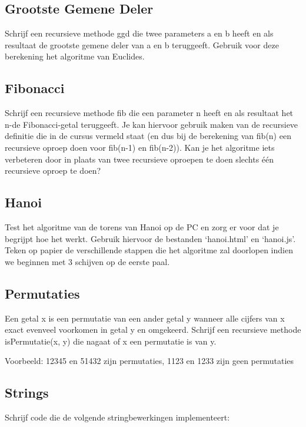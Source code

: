 \subsection{Grootste Gemene Deler}

Schrijf een recursieve methode ggd die twee parameters a en b heeft en als resultaat de grootste gemene deler van a en b teruggeeft. Gebruik voor deze berekening het algoritme van Euclides.

\subsection{Fibonacci}

Schrijf een recursieve methode fib die een parameter n heeft en als resultaat het n-de Fibonacci-getal teruggeeft. Je kan hiervoor gebruik maken van de recursieve definitie die in de cursus vermeld staat (en dus bij de berekening van fib(n) een recursieve oproep doen voor fib(n-1) en fib(n-2)). Kan je het algoritme iets verbeteren door in plaats van twee recursieve oproepen te doen slechts \'e\'en recursieve oproep te doen?

\subsection{Hanoi}

Test het algoritme van de torens van Hanoi op de PC en zorg er voor dat je begrijpt hoe het werkt. Gebruik hiervoor de bestanden `hanoi.html' en `hanoi.js'. Teken op papier de verschillende stappen die het algoritme zal doorlopen indien we beginnen met 3 schijven op de eerste paal.

\subsection{Permutaties}

Een getal x is een permutatie van een ander getal y wanneer alle cijfers van x exact evenveel voorkomen in getal y en omgekeerd. Schrijf een recursieve methode isPermutatie(x, y) die nagaat of x een permutatie is van y.

Voorbeeld: 12345  en 51432 zijn permutaties, 1123 en 1233 zijn geen permutaties

\subsection{Strings}

Schrijf code die de volgende stringbewerkingen implementeert:

